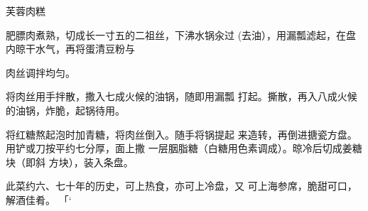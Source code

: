 \begin{recipe}{芙蓉肉糕}

\ingredients


\cooking

\step 	肥膘肉煮熟，切成长一寸五的二祖丝，下沸水锅汆过 (去油），用漏瓢滤起，在盘内晾干水气，再将蛋清豆粉与

肉丝调拌均匀。

\step 	将肉丝用手拌散，撒入七成火候的油锅，随即用漏瓢 打起。撕散，再入八成火候的油锅，炸脆，起锅待用。

\step 	将红糖熬起泡时加青糖，将肉丝倒入。随手将锅提起 来造转，再倒进搪瓷方盘。用铲或刀按平约七分厚，面上撒 一层胭脂糖（白糖用色素调成）。晾冷后切成姜糖块（即斜 方块），装入条盘。

\notes

此菜约六、七十年的历史，可上热食，亦可上冷盘，又 可上海参席，脆甜可口，解酒佳肴。	「‘

\end{recipe}


